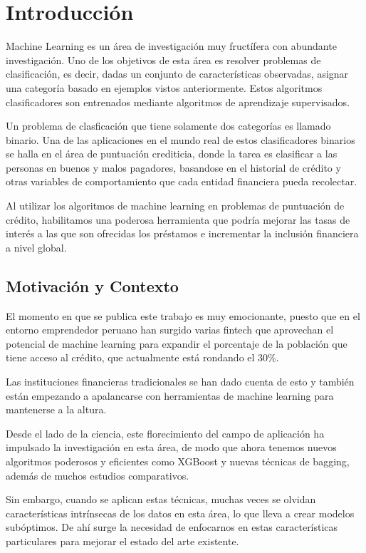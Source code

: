 \chapter{Introducción}

Machine Learning es un área de investigación muy fructífera con abundante investigación. Uno de los objetivos de esta área es resolver problemas de clasificación, es decir, dadas un conjunto de características observadas, asignar una categoría basado en ejemplos vistos anteriormente. Estos algoritmos clasificadores son entrenados mediante algoritmos de aprendizaje supervisados.

Un problema de clasficación que tiene solamente dos categorías es llamado binario. Una de las aplicaciones en el mundo real de estos clasificadores binarios se halla en el área de puntuación crediticia, donde la tarea es clasificar a las personas en buenos y malos pagadores, basandose en el historial de crédito y otras variables de comportamiento que cada entidad financiera pueda recolectar.

Al utilizar los algoritmos de machine learning en problemas de puntuación de crédito, habilitamos una poderosa herramienta que podría mejorar las tasas de interés a las que son ofrecidas los préstamos e incrementar la inclusión financiera a nivel global.

\section{Motivación y Contexto}

El momento en que se publica este trabajo es muy emocionante, puesto que en el entorno emprendedor peruano han surgido varias fintech que aprovechan el potencial de machine learning para expandir el porcentaje de la población que tiene acceso al crédito, que actualmente está rondando el 30\%.

Las instituciones financieras tradicionales se han dado cuenta de esto y también están empezando a apalancarse con herramientas de machine learning para mantenerse a la altura.

Desde el lado de la ciencia, este florecimiento del campo de aplicación ha impulsado la investigación en esta área, de modo que ahora tenemos nuevos algoritmos poderosos y eficientes como \ac{XGBoost} y nuevas técnicas de bagging, además de muchos estudios comparativos.

Sin embargo, cuando se aplican estas técnicas, muchas veces se olvidan características intrínsecas de los datos en esta área, lo que lleva a crear modelos subóptimos. De ahí surge la necesidad de enfocarnos en estas características particulares para mejorar el estado del arte existente.

